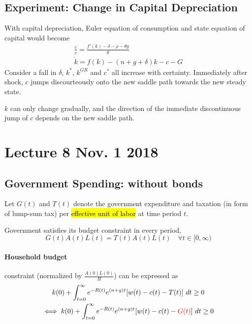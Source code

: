 \documentclass[11pt]{article}
\begin{document}
		\subsection{Experiment: Change in Capital Depreciation}
			\par With capital depreciation, Euler equation of consumption and state equation of capital would become
			\begin{gather}
				\frac{\dot{c}}{c} = \frac{f'(k)-\delta-\rho-\theta g}{\theta} \\
				\dot{k} = f(k) - (n+g+\delta)k - c - G
			\end{gather}
			Consider a fall in $\delta$, $k^*$, $k^{GR}$ and $c^*$ all increase with certainty. Immediately after shock, $c$ jumps discourteously onto the new saddle path towards the new steady state. 
			\begin{remark}
				$k$ can only change gradually, and the direction of the immediate discontinuous jump of $c$ depends on the new saddle path.
			\end{remark}
			
	\newpage
	\section{Lecture 8 Nov. 1 2018}
		\subsection{Government Spending: without bonds}
			\begin{notation}
				Let $G(t)$ and $T(t)$ denote the government expenditure and taxation (in form of lump-sum tax) per \hl{effective unit of labor} at time period $t$.
			\end{notation}
			
			\begin{assumption}
				Government satisfies its budget constraint in every period,
				\begin{equation}
					G(t) A(t) L(t) = T(t) A(t) L(t)\quad \forall t \in [0, \infty)
				\end{equation}
			\end{assumption}
			
			\paragraph{Household budget} constraint (normalized by $\frac{A(0)L(0)}{H}$) can be expressed as
			\begin{gather}
				k(0) + \int_{t=0}^\infty {e^{-R(t)} e^{(n+g)t} [w(t) - c(t) - T(t)]}\ dt \geq 0 \\
				\iff k(0) + \int_{t=0}^\infty {e^{-R(t)} e^{(n+g)t} [w(t) - c(t) - \textcolor{red}{G(t)}]}\ dt \geq 0
			\end{gather}
			
\end{document}
